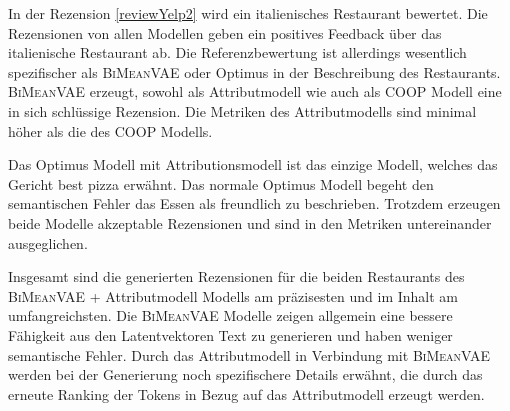 In der Rezension \ref{reviewYelp2} wird ein italienisches Restaurant bewertet. 
Die Rezensionen von allen Modellen geben ein positives Feedback über das italienische Restaurant ab. 
Die Referenzbewertung ist allerdings wesentlich spezifischer als \textsc{BiMeanVAE} oder Optimus in der Beschreibung des Restaurants.
\textsc{BiMeanVAE} erzeugt, sowohl als Attributmodell wie auch als COOP Modell eine in sich schlüssige Rezension. 
Die Metriken des Attributmodells sind minimal höher als die des COOP Modells.

Das Optimus Modell mit Attributionsmodell ist das einzige Modell, welches das Gericht \glqq{}best pizza\grqq{} erwähnt. 
Das normale Optimus Modell begeht den semantischen Fehler das Essen als freundlich zu beschrieben. 
Trotzdem erzeugen beide Modelle akzeptable Rezensionen und sind in den Metriken untereinander ausgeglichen.



Insgesamt sind die generierten Rezensionen für die beiden Restaurants des \textsc{BiMeanVAE} + Attributmodell Modells am präzisesten und im Inhalt am umfangreichsten. 
Die \textsc{BiMeanVAE} Modelle zeigen allgemein eine bessere Fähigkeit aus den Latentvektoren Text zu generieren und haben weniger semantische Fehler.
Durch das Attributmodell in Verbindung mit \textsc{BiMeanVAE} werden bei der Generierung noch spezifischere Details erwähnt, die durch das erneute Ranking der Tokens in Bezug auf das Attributmodell erzeugt werden.


\pagebreak
